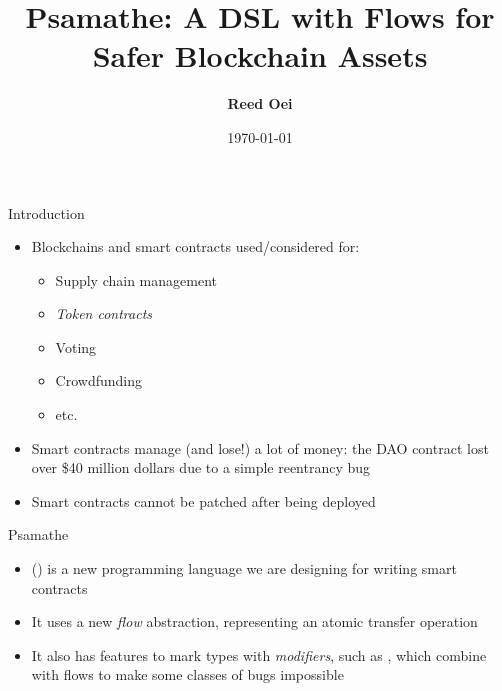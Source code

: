 \documentclass[leqno,presentation,usenames,dvipsnames]{beamer}
\title{Psamathe: A DSL with Flows for Safer Blockchain Assets}
\author{\textbf{Reed Oei}}
\institute{University of Illinois, Urbana, US\\
\url{reedoei2@illinois.edu}}
\date{\today}
\begin{document}
\frame{\titlepage}

\begin{frame}{Introduction}
    \begin{itemize}
        \item Blockchains and smart contracts used/considered for:
            \begin{itemize}
                \item Supply chain management
                \item \emph{Token contracts}
                \item Voting
                \item Crowdfunding
                \item etc.
            \end{itemize}

        \item Smart contracts manage (and lose!) a lot of money: the DAO contract lost over \$40 million dollars due to a simple reentrancy bug

        \item Smart contracts cannot be patched after being deployed
    \end{itemize}
\end{frame}

\begin{frame}[fragile]{Psamathe}
    \begin{itemize}
        \item \langName (\langNamePronounce) is a new programming language we are designing for writing smart contracts
        \item It uses a new \emph{flow} abstraction, representing an atomic transfer operation
        \item It also has features to mark types with \emph{modifiers}, such as , which combine with flows to make some classes of bugs impossible
    \end{itemize}

    
\end{frame}
\end{document}
